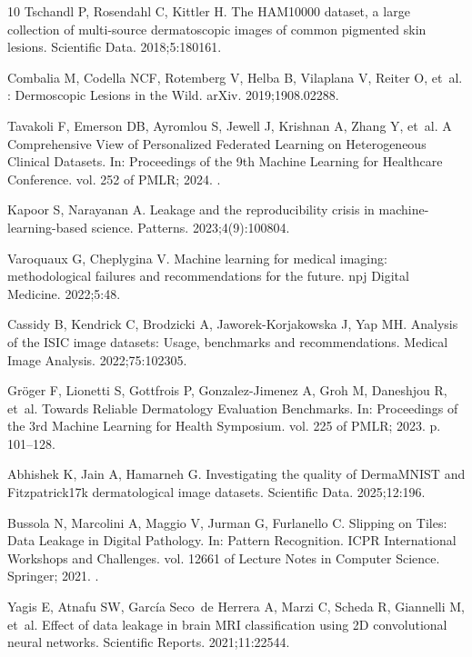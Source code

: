 \documentclass[VANCOUVER,Times1COL]{WileyNJDv5}
\begin{document}
\begin{thebibliography}{10}
Tschandl P, Rosendahl C, Kittler H.
\newblock The {HAM10000} dataset, a large collection of multi-source
  dermatoscopic images of common pigmented skin lesions.
\newblock Scientific Data. 2018;5:180161.

Combalia M, Codella NCF, Rotemberg V, Helba B, Vilaplana V, Reiter O, et~al.
: Dermoscopic Lesions in the Wild.
\newblock arXiv. 2019;1908.02288.

Tavakoli F, Emerson DB, Ayromlou S, Jewell J, Krishnan A, Zhang Y, et~al.
\newblock A Comprehensive View of Personalized Federated Learning on
  Heterogeneous Clinical Datasets.
\newblock In: Proceedings of the 9th Machine Learning for Healthcare
  Conference. vol. 252 of PMLR; 2024. .

Kapoor S, Narayanan A.
\newblock Leakage and the reproducibility crisis in machine-learning-based
  science.
\newblock Patterns. 2023;4(9):100804.

Varoquaux G, Cheplygina V.
\newblock Machine learning for medical imaging: methodological failures and
  recommendations for the future.
\newblock npj Digital Medicine. 2022;5:48.

Cassidy B, Kendrick C, Brodzicki A, Jaworek-Korjakowska J, Yap MH.
\newblock Analysis of the {ISIC} image datasets: Usage, benchmarks and
  recommendations.
\newblock Medical Image Analysis. 2022;75:102305.

Gr{\"o}ger F, Lionetti S, Gottfrois P, Gonzalez-Jimenez A, Groh M, Daneshjou R,
  et~al.
\newblock Towards Reliable Dermatology Evaluation Benchmarks.
\newblock In: Proceedings of the 3rd Machine Learning for Health Symposium.
  vol. 225 of PMLR; 2023. p. 101--128.

Abhishek K, Jain A, Hamarneh G.
\newblock Investigating the quality of {DermaMNIST} and {Fitzpatrick17k}
  dermatological image datasets.
\newblock Scientific Data. 2025;12:196.

Bussola N, Marcolini A, Maggio V, Jurman G, Furlanello C.
 Slipping on Tiles: Data Leakage in Digital Pathology.
\newblock In: Pattern Recognition. ICPR International Workshops and Challenges.
  vol. 12661 of Lecture Notes in Computer Science. Springer; 2021. .

Yagis E, Atnafu SW, Garc{\'i}a Seco~de Herrera A, Marzi C, Scheda R, Giannelli
  M, et~al.
\newblock Effect of data leakage in brain {MRI} classification using {2D}
  convolutional neural networks.
\newblock Scientific Reports. 2021;11:22544.


\end{thebibliography}
\end{document}
